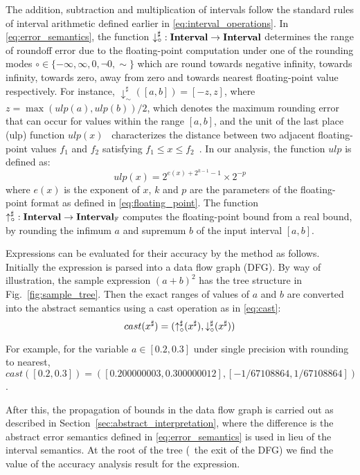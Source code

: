 The addition, subtraction and multiplication of intervals follow the standard
rules of interval arithmetic defined earlier in \eqref{eq:interval_operations}.
In \eqref{eq:error_semantics}, the function $\operatorname{\downarrow^\sharp_\circ}: \mathbf{Interval} \to
\mathbf{Interval}$ determines the range of roundoff error due to the floating-point
computation under one of the rounding modes $\circ \in \{ -\infty, \infty, 0,
\neg0, \sim \}$ which are round towards negative infinity, towards infinity,
towards zero, away from zero and towards nearest floating-point value
respectively. For instance, $\downarrow^\sharp_\sim([a, b]) = [-z, z]$, where
$z = \max(ulp(a), ulp(b)) / 2$, which denotes the maximum rounding error that
can occur for values within the range $[a, b]$, and the unit of the last place
(ulp) function $ulp(x)$~\cite{muller} characterizes the distance between two
adjacent floating-point values $f_1$ and $f_2$ satisfying $f_1 \leq x \leq
f_2$~\cite{goldberg}. In our analysis, the function $ulp$ is defined as:
\begin{equation}
    ulp(x) = 2^{e(x) + 2^{k - 1} - 1} \times 2^{-p}
\end{equation}
where $e(x)$ is the exponent of $x$, $k$ and $p$ are the parameters of the
floating-point format as defined in \eqref{eq:floating_point}. The function
$\operatorname{\uparrow^\sharp_\circ}: \mathbf{Interval} \to \mathbf{Interval}_\mathbb{F}$ computes the floating-point
bound from a real bound, by rounding the infimum $a$ and supremum $b$ of the
input interval $[a, b]$.

Expressions can be evaluated for their accuracy by the method as follows.
Initially the expression is parsed into a data flow graph (DFG). By way of
illustration, the sample expression ${(a + b)}^2$ has the tree structure
in Fig.~\ref{fig:sample_tree}. Then the exact ranges of values of $a$ and
$b$ are converted into the abstract semantics using a cast operation as in
\eqref{eq:cast}:
\begin{equation}
    cast(x^\sharp) = (\operatorname{\uparrow^\sharp_\circ}(x^\sharp), \operatorname{\downarrow^\sharp_\circ}(x^\sharp))
    \label{eq:cast}
\end{equation}

For example, for the variable $a \in [0.2, 0.3]$ under single precision
with rounding to nearest, $cast([0.2, 0.3]) = ([0.200000003, 0.300000012],
[-1/67108864, 1/67108864])$.

After this, the propagation of bounds in the data flow graph is carried out as
described in Section~\ref{sec:abstract_interpretation}, where the difference is
the abstract error semantics defined in \eqref{eq:error_semantics} is used in
lieu of the interval semantics. At the root of the tree (\ie~the exit of the
DFG) we find the value of the accuracy analysis result for the expression.

